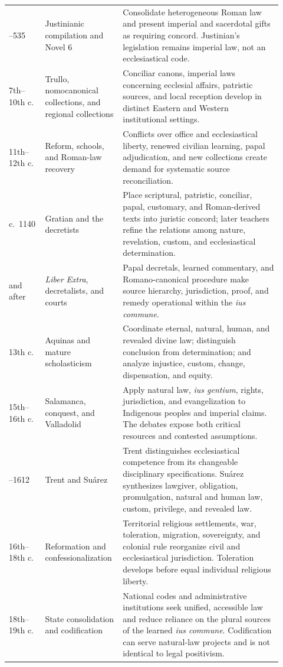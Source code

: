 \begin{longtable}{>{\bfseries\raggedright\arraybackslash}p{0.12\linewidth}>{\raggedright\arraybackslash}p{0.24\linewidth}>{\raggedright\arraybackslash}p{0.56\linewidth}}
533--535 & Justinianic compilation and Novel 6 & Consolidate heterogeneous Roman law and present imperial and sacerdotal gifts as requiring concord. Justinian's legislation remains imperial law, not an ecclesiastical code.\\
7th--10th c. & Trullo, nomocanonical collections, and regional collections & Conciliar canons, imperial laws concerning ecclesial affairs, patristic sources, and local reception develop in distinct Eastern and Western institutional settings.\\
11th--12th c. & Reform, schools, and Roman-law recovery & Conflicts over office and ecclesiastical liberty, renewed civilian learning, papal adjudication, and new collections create demand for systematic source reconciliation.\\
c.~1140 & Gratian and the decretists & Place scriptural, patristic, conciliar, papal, customary, and Roman-derived texts into juristic concord; later teachers refine the relations among nature, revelation, custom, and ecclesiastical determination.\\
1234 and after & \emph{Liber Extra}, decretalists, and courts & Papal decretals, learned commentary, and Romano-canonical procedure make source hierarchy, jurisdiction, proof, and remedy operational within the \emph{ius commune}.\\
13th c. & Aquinas and mature scholasticism & Coordinate eternal, natural, human, and revealed divine law; distinguish conclusion from determination; and analyze injustice, custom, change, dispensation, and equity.\\
15th--16th c. & Salamanca, conquest, and Valladolid & Apply natural law, \emph{ius gentium}, rights, jurisdiction, and evangelization to Indigenous peoples and imperial claims. The debates expose both critical resources and contested assumptions.\\
1545--1612 & Trent and Su\'arez & Trent distinguishes ecclesiastical competence from its changeable disciplinary specifications. Su\'arez synthesizes lawgiver, obligation, promulgation, natural and human law, custom, privilege, and revealed law.\\
16th--18th c. & Reformation and confessionalization & Territorial religious settlements, war, toleration, migration, sovereignty, and colonial rule reorganize civil and ecclesiastical jurisdiction. Toleration develops before equal individual religious liberty.\\
18th--19th c. & State consolidation and codification & National codes and administrative institutions seek unified, accessible law and reduce reliance on the plural sources of the learned \emph{ius commune}. Codification can serve natural-law projects and is not identical to legal positivism.\\

\end{longtable}
